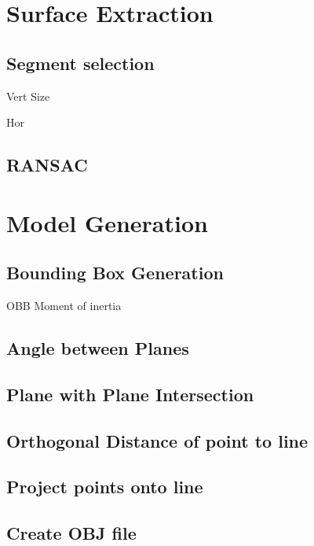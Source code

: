 	


\section{Surface Extraction}
		
		\subsection{Segment selection}
			Vert
			Size
			
			Hor

		\subsection{RANSAC}


\section{Model Generation}
		\subsection{Bounding Box Generation}
		OBB
		Moment of inertia
		
		\subsection{Angle between Planes}
		
		\subsection{Plane with Plane Intersection}
		
		\subsection{Orthogonal Distance of point to line}
		
		\subsection{Project points onto line}
		
		\subsection{Create OBJ file}

	


